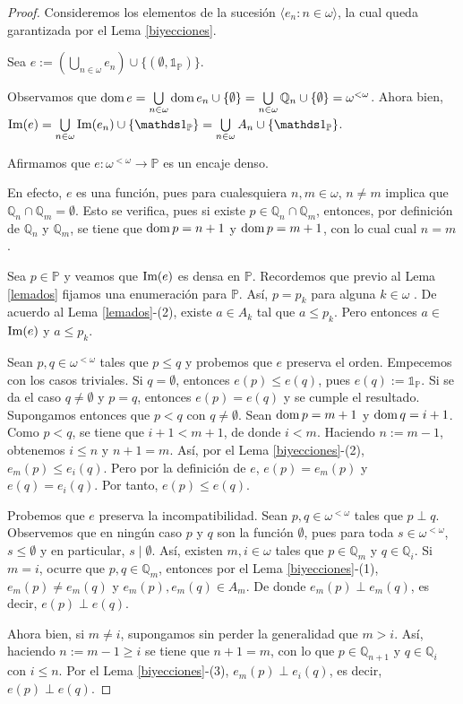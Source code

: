 \documentclass[11pt]{unam_tesis1}
\theoremstyle{MyThmStyle}
\theoremstyle{definition}
\theoremstyle{plain}
\theoremstyle{remark}
\def\dom{\mathop{\rm dom}\nolimits}
\let\leq\leqslant
\let\geq\geqslant
\begin{document}
\begin{proof}
Consideremos los elementos de la sucesi\'on $\langle e_n:n\in \omega \rangle$, la cual queda garantizada por el Lema \ref{biyecciones}.

Sea $e:=(\bigcup \limits_{n\in \omega}e_n) \cup \{(\emptyset, \mathds 1_{\mathbb P}) \}$.

Observamos que $\dom e=\bigcup \limits_{n\in \omega}\dom e_n\cup \{\emptyset \}=\bigcup \limits_{n\in \omega}\mathbb Q_n \cup \{\emptyset \}=\omega^{<\omega}$. Ahora bien, $\textnormal{Im}(e)=\bigcup \limits_{n\in \omega} \textnormal{Im}(e_n)\cup \{\mathds 1_{\mathbb P} \}=\bigcup \limits_{n\in \omega} A_n \cup  \{\mathds 1_{\mathbb P} \}$.

Afirmamos que $e:\omega^{<\omega} \to \mathbb P$ es un encaje denso.

En efecto, $e$ es una funci\'on, pues para cualesquiera $n,m\in \omega$, $n\neq m$ implica que $\mathbb Q_n\cap \mathbb Q_m=\emptyset$. Esto se verifica, pues si existe $p\in \mathbb Q_n\cap \mathbb Q_m$, entonces, por definici\'on de $\mathbb Q_n$ y $\mathbb Q_m$, se tiene que $\dom p=n+1$ y $\dom p=m+1$, con lo cual cual $n=m$.

Sea $p\in \mathbb P$ y veamos que $\textnormal{Im}(e)$ es densa en $\mathbb P$. Recordemos que previo al Lema \ref{lemados} fijamos una enumeraci\'on para $\mathbb P$. As\'i, $p=p_k$ para alguna $k\in \omega$ . De acuerdo al Lema \ref{lemados}-(2), existe $a\in A_k$ tal que $a\leq p_k$. Pero entonces $a\in$ $\textnormal{Im}(e)$ y $a\leq p_k$.

Sean $p,q \in \omega^{<\omega}$ tales que $p\leq q$ y probemos que $e$ preserva el orden. Empecemos con los casos triviales. Si $q=\emptyset$, entonces $e(p)\leq e(q)$, pues $e(q):=\mathds 1_{\mathbb P}$. Si se da el caso $q\neq \emptyset$ y $p=q$, entonces $e(p)=e(q)$ y se cumple el resultado. Supongamos entonces que $p< q$ con $q\neq \emptyset$. Sean $\dom p=m+1$ y $\dom q=i+1$. Como $p<q$, se tiene que $i+1< m+1$, de donde $i<m$. Haciendo $n:=m-1$, obtenemos $i\leq n$ y $n+1=m$. As\'i, por el Lema \ref{biyecciones}-(2), $e_m(p)\leq e_i(q)$. Pero por la definici\'on de $e$, $e(p)=e_m(p)$ y $e(q)=e_i(q)$. Por tanto, $e(p)\leq e(q)$.

Probemos que $e$ preserva la incompatibilidad. Sean $p,q\in \omega^{<\omega}$ tales que $p\perp q$. Observemos que en ning\'un caso $p$ y $q$ son la funci\'on $\emptyset$, pues para toda $s\in \omega^{<\omega}$, $s\leq \emptyset$ y en particular, $s\mid \emptyset$. As\'i, existen $m,i\in \omega$ tales que $p\in \mathbb Q_m$ y $q\in \mathbb Q_i$. Si $m=i$, ocurre que $p,q\in \mathbb Q_m$, entonces por el Lema \ref{biyecciones}-(1), $e_m(p)\neq e_m(q)$ y $e_m(p), e_m(q)\in A_m$. De donde $e_m(p)\perp e_m(q)$, es decir, $e(p)\perp e(q)$.

Ahora bien, si $m\neq i$, supongamos sin perder la generalidad que $m>i$. As\'i, haciendo $n:=m-1\geq i$ se tiene que $n+1=m$, con lo que $p\in \mathbb Q_{n+1}$ y $q\in \mathbb Q_i$ con $i\leq n$. Por el Lema \ref{biyecciones}-(3), $e_{m}(p)\perp e_i(q)$, es decir, $e(p)\perp e(q)$.
\end{proof}
\end{document}
